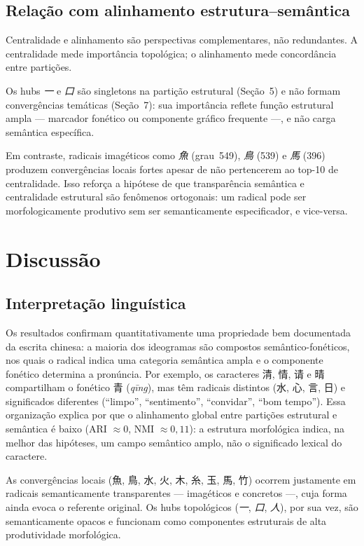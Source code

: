 \documentclass[10pt, a4paper, titlepage]{extarticle}
\begin{document}
\subsection{Relação com alinhamento estrutura--semântica}
Centralidade e alinhamento são perspectivas complementares, não redundantes. A centralidade mede importância topológica; o alinhamento mede concordância entre partições.

Os hubs \textit{一} e \textit{口} são singletons na partição estrutural (Seção~5) e não formam convergências temáticas (Seção~7): sua importância reflete função estrutural ampla --- marcador fonético ou componente gráfico frequente ---, e não carga semântica específica.

Em contraste, radicais imagéticos como \textit{魚} (grau~549),
\textit{鳥} (539) e \textit{馬} (396) produzem convergências locais fortes apesar de não pertencerem ao top-10 de centralidade. Isso reforça a hipótese de que transparência semântica e centralidade estrutural são fenômenos ortogonais: um radical pode ser morfologicamente produtivo sem ser semanticamente especificador, e vice-versa.

\section{Discussão}
\subsection{Interpretação linguística}
Os resultados confirmam quantitativamente uma propriedade bem documentada da escrita chinesa: a maioria dos ideogramas são compostos semântico-fonéticos, nos quais o radical indica uma categoria semântica ampla e o componente fonético determina a pronúncia. Por exemplo, os caracteres 清, 情, 请 e 晴 compartilham o fonético 青 (\emph{qīng}), mas têm radicais distintos (水, 心, 言, 日) e significados diferentes (``limpo'', ``sentimento'', ``convidar'', ``bom tempo''). Essa organização explica por que o alinhamento global entre partições estrutural e semântica é baixo (ARI $\approx 0$, NMI $\approx 0{,}11$): a estrutura morfológica indica, na melhor das hipóteses, um campo semântico amplo, não o significado lexical do caractere.

As convergências locais (魚, 鳥, 水, 火, 木, 糸, 玉, 馬, 竹) ocorrem justamente em radicais semanticamente transparentes --- imagéticos e concretos ---, cuja forma ainda evoca o referente original. Os hubs topológicos (\textit{一}, \textit{口}, \textit{人}), por sua vez, são semanticamente opacos e funcionam como componentes estruturais de alta produtividade morfológica.
\end{document}
